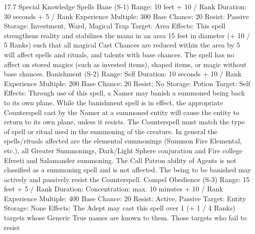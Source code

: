 \documentclass[a4paper]{article}
\begin{document}
\begin{multicols}{3}
17.7 Special Knowledge Spells
Bane (S-1)
Range: 10 feet + 10 / Rank
Duration: 30 seconds + 5 / Rank
Experience Multiple: 300
Base Chance: 20%
Resist: Passive
Storage: Investment, Ward, Magical Trap
Target: Area
Effects: This spell strengthens reality and stabilizes
the mana in an area 15 feet in diameter (+ 10 / 5
Ranks) such that all magical Cast Chances are
reduced within the area by 5%
will affect spells and rituals, and talents with base
chances. The spell has no affect on stored magics
(such as invested items), shaped items, or magic
without base chances.
Banishment (S-2)
Range: Self
Duration: 10 seconds + 10 / Rank
Experience Multiple: 200
Base Chance: 20%
Resist: No
Storage: Potion
Target: Self
Effects: Through use of this spell, a Namer may
banish a summoned being back to its own plane.
While the banishment spell is in effect, the appropriate Counterspell cast by the Namer at a summoned entity will cause the entity to return to its
own plane, unless it resists. The Counterspell must
match the type of spell or ritual used in the summoning of the creature. In general the spells/rituals
affected are the elemental summonings (Summon
Fire Elemental, etc.), all Greater Summonings,
Dark/Light Sphere conjuration and Fire college
Efreeti and Salamander summoning. The Call
Patron ability of Agents is not classified as a summoning spell and is not affected. The being to be
banished may actively and passively resist the
Counterspell.
Compel Obedience (S-3)
Range: 15 feet + 5 / Rank
Duration: Concentration: max. 10 minutes + 10 /
Rank
Experience Multiple: 400
Base Chance: 20%
Resist: Active, Passive
Target: Entity
Storage: None
Effects: The Adept may cast this spell over 1 (+ 1 /
4 Ranks) targets whose Generic True names are
known to them. Those targets who fail to resist


\end{multicols}
\end{document}
